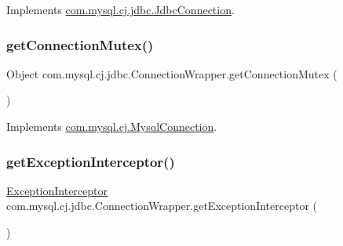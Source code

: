 Implements \mbox{\hyperlink{interfacecom_1_1mysql_1_1cj_1_1jdbc_1_1_jdbc_connection_ab3325dceec74bde20215836ade6845ad}{com.\+mysql.\+cj.\+jdbc.\+Jdbc\+Connection}}.

\mbox{\label{classcom_1_1mysql_1_1cj_1_1jdbc_1_1_connection_wrapper_a6542c75a7fef46e1f62e68a00c01d211}} 
\subsubsection{\texorpdfstring{get\+Connection\+Mutex()}{getConnectionMutex()}}
{\footnotesize\ttfamily Object com.\+mysql.\+cj.\+jdbc.\+Connection\+Wrapper.\+get\+Connection\+Mutex (\begin{DoxyParamCaption}{ }\end{DoxyParamCaption})}



Implements \mbox{\hyperlink{interfacecom_1_1mysql_1_1cj_1_1_mysql_connection_a9509cf17d31eff921de41b8ecd03278f}{com.\+mysql.\+cj.\+Mysql\+Connection}}.

\mbox{\label{classcom_1_1mysql_1_1cj_1_1jdbc_1_1_connection_wrapper_a3f7f70fcff77c01e2e8d4bf12802d0e0}} 
\subsubsection{\texorpdfstring{get\+Exception\+Interceptor()}{getExceptionInterceptor()}}
{\footnotesize\ttfamily \mbox{\hyperlink{interfacecom_1_1mysql_1_1cj_1_1exceptions_1_1_exception_interceptor}{Exception\+Interceptor}} com.\+mysql.\+cj.\+jdbc.\+Connection\+Wrapper.\+get\+Exception\+Interceptor (\begin{DoxyParamCaption}{ }\end{DoxyParamCaption})}



